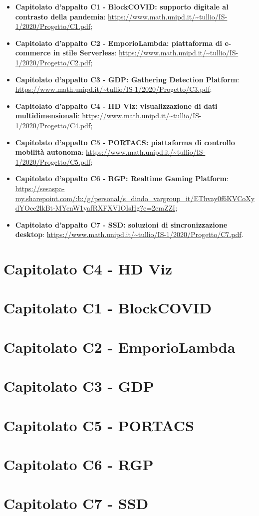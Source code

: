 \documentclass{article}
\begin{document}
\begin{itemize}
  \item \textbf{Capitolato d'appalto C1 - BlockCOVID: supporto digitale al contrasto della pandemia}: \url{https://www.math.unipd.it/~tullio/IS-1/2020/Progetto/C1.pdf};
  \item \textbf{Capitolato d'appalto C2 - EmporioLambda: piattaforma di e-commerce in stile Serverless}: \url{https://www.math.unipd.it/~tullio/IS-1/2020/Progetto/C2.pdf};
  \item \textbf{Capitolato d'appalto C3 - GDP: Gathering Detection Platform}: \url{https://www.math.unipd.it/~tullio/IS-1/2020/Progetto/C3.pdf};
  \item \textbf{Capitolato d'appalto C4 - HD Viz: visualizzazione di dati multidimensionali}: \url{https://www.math.unipd.it/~tullio/IS-1/2020/Progetto/C4.pdf};
  \item \textbf{Capitolato d'appalto C5 - PORTACS: piattaforma di controllo mobilità autonoma}: \url{https://www.math.unipd.it/~tullio/IS-1/2020/Progetto/C5.pdf};
  \item \textbf{Capitolato d'appalto C6 - RGP: Realtime Gaming Platform}: \url{https://sesaspa-my.sharepoint.com/:b:/g/personal/s_dindo_vargroup_it/EThvay0f6KVCoXydYOce2lkBt-MYcnW1yafRXFXVIOIsHg?e=2emZZI};
  \item \textbf{Capitolato d'appalto C7 - SSD: soluzioni di sincronizzazione desktop}: \url{https://www.math.unipd.it/~tullio/IS-1/2020/Progetto/C7.pdf}.
\end{itemize}

\newpage
\section{Capitolato C4 - HD Viz}
\label{sec:c4}


\newpage
\section{Capitolato C1 - BlockCOVID}
\label{sec:c1}


\newpage
\section{Capitolato C2 - EmporioLambda}
\label{sec:c2}


\newpage
\section{Capitolato C3 - GDP}
\label{sec:c3}


\newpage
\section{Capitolato C5 - PORTACS}
\label{sec:c5}


\newpage
\section{Capitolato C6 - RGP}
\label{sec:c6}


\newpage
\section{Capitolato C7 - SSD}
\label{sec:c7}

\end{document}
